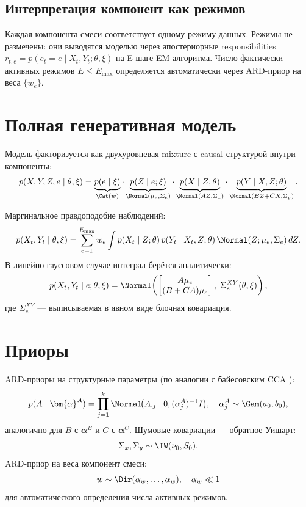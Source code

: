\documentclass[a4paper,14pt]{article}
\renewcommand{\leq}{\ensuremath{\leqslant}}
\theoremstyle{plain} %
\theoremstyle{definition} %
\theoremstyle{remark} %
\begin{document}
\subsection{Интерпретация компонент как режимов}

Каждая компонента смеси соответствует одному режиму данных. Режимы не размечены: они выводятся моделью через апостериорные responsibilities $r_{t,e} = p(e_t = e \mid X_t, Y_t; \theta, \xi)$ на E-шаге EM-алгоритма. Число фактически активных режимов $E \leq E_{\max}$ определяется автоматически через ARD-приор на веса $\{w_e\}$.

\section{Полная генеративная модель}

Модель факторизуется как двухуровневая mixture с causal-структурой внутри компоненты:
\begin{equation}
    p(X, Y, Z, e \mid \theta, \xi) = \underbrace{p(e \mid \xi)}_{\Cat(w)} \cdot \underbrace{p(Z \mid e; \xi)}_{\Normal(\mu_e, \Sigma_e)} \cdot \underbrace{p(X \mid Z; \theta)}_{\Normal(AZ, \Sigma_x)} \cdot \underbrace{p(Y \mid X, Z; \theta)}_{\Normal(BZ + CX, \Sigma_y)}.
\end{equation}

Маргинальное правдоподобие наблюдений:
\begin{equation}
    p(X_t, Y_t \mid \theta, \xi) = \sum_{e=1}^{E_{\max}} w_e \int p(X_t \mid Z; \theta)\, p(Y_t \mid X_t, Z; \theta)\, \Normal(Z; \mu_e, \Sigma_e)\, dZ.
\end{equation}
В линейно-гауссовом случае интеграл берётся аналитически:
\begin{equation}
    p(X_t, Y_t \mid e; \theta, \xi) = \Normal\!\left(\begin{bmatrix} A\mu_e \\ (B+CA)\mu_e \end{bmatrix},\ \Sigma_e^{XY}(\theta, \xi)\right),
\end{equation}
где $\Sigma_e^{XY}$ --- выписываемая в явном виде блочная ковариация.

\section{Приоры}

ARD-приоры на структурные параметры (по аналогии с байесовским CCA \cite{klami2013bayesian}):
\begin{equation}
    p(A \mid \bm{\alpha}^A) = \prod_{j=1}^{k} \Normal\!\big(A_{\cdot j} \mid 0, (\alpha^A_j)^{-1} I\big), \quad \alpha^A_j \sim \Gam(a_0, b_0),
\end{equation}
аналогично для $B$ с $\bm{\alpha}^B$ и $C$ с $\bm{\alpha}^C$. Шумовые ковариации --- обратное Уишарт:
\begin{equation}
    \Sigma_x, \Sigma_y \sim \IW(\nu_0, S_0).
\end{equation}
ARD-приор на веса компонент смеси:
\begin{equation}
    w \sim \Dir(\alpha_w, \dots, \alpha_w), \quad \alpha_w \ll 1
\end{equation}
для автоматического определения числа активных режимов.
\end{document}
